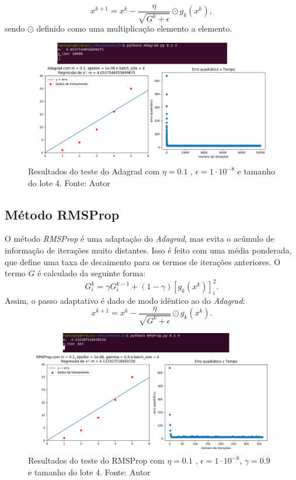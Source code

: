 \documentclass[a4paper,12pt]{article}
\begin{document}
$$x^{k+1}=x^k-\frac{\eta}{\sqrt{G^k+\epsilon}} \odot g_k(x^k),$$
sendo $\odot$ definido como uma multiplicação elemento a elemento.


\begin{figure}[H]
\centering 
\includegraphics[scale=0.5]{Figuras/Adagrad.png}
\caption{Resultados do teste do Adagrad com $\eta = 0.1 $ , $\epsilon = 1\cdot 10^{-8}$ e tamanho do lote 4. Fonte: Autor}
\end{figure} 


\subsection{Método RMSProp}
O método \textit{RMSProp} é uma adaptação do \textit{Adagrad}, mas evita o acúmulo de informação de iterações muito distantes. Isso é feito com uma média ponderada, que define uma taxa de decaimento para os termos de iterações anteriores. O termo $G$ é calculado da seguinte forma:
$$G_i^k= \gamma G_{i}^{k-1}+ (1-\gamma)[g_k(x^k)]_i^2.$$
Assim, o passo adaptativo é dado de modo idêntico ao do \textit{Adagrad}:
$$x^{k+1}=x^k-\frac{\eta}{\sqrt{G^k+\epsilon}} \odot g_k(x^k).$$

\begin{figure}[H]
\centering 
\includegraphics[scale=0.5]{Figuras/RMSProp.png}
\caption{Resultados do teste do RMSProp com $\eta = 0.1 $ , $\epsilon = 1\cdot 10^{-8}$, $\gamma = 0.9$ e tamanho do lote 4. Fonte: Autor}
\label{fig:RMS}
\end{figure} 
\end{document}
